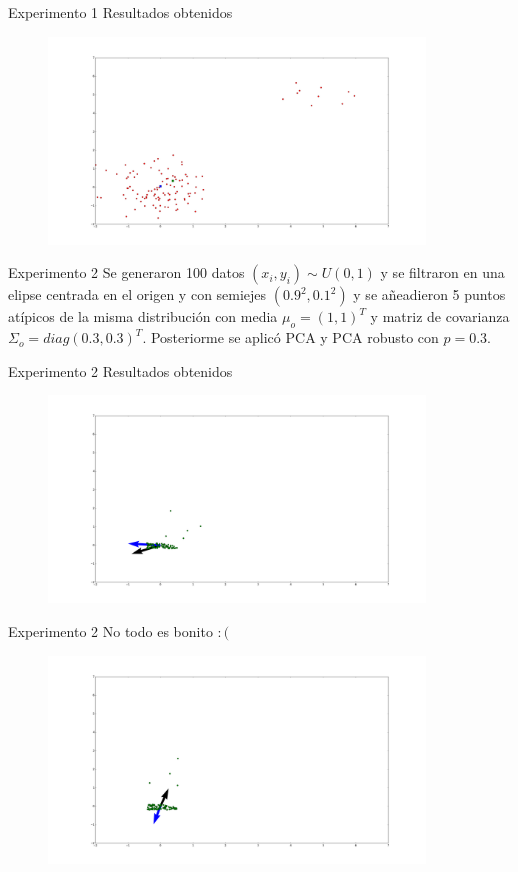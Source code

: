 \documentclass{beamer}
\begin{document}
\begin{frame}{Experimento 1}
	Resultados obtenidos
	\begin{figure}
		\includegraphics[width=10cm]{GM1.png}
	\end{figure}
\end{frame}

\begin{frame}{Experimento 2}
	Se generaron 100 datos $(x_i, y_i) \sim U(0, 1)$ y se filtraron en una elipse centrada en el origen y con semiejes $(0.9^2, 0.1^2)$ y se añeadieron 5 puntos atípicos de la misma distribución con media $\mu_o = (1, 1)^T$ y matriz de covarianza $\Sigma_o = diag(0.3, 0.3)^T$. Posteriorme se aplicó PCA y PCA robusto con $p = 0.3$.
\end{frame}


\begin{frame}{Experimento 2}
	Resultados obtenidos
	\begin{figure}
		\includegraphics[width=10cm]{GPCA1.png}
	\end{figure}
\end{frame}

\begin{frame}{Experimento 2}
	No todo es bonito $:($
	\begin{figure}
		\includegraphics[width=10cm]{GPCA2.png}
	\end{figure}
\end{frame}
\end{document}
